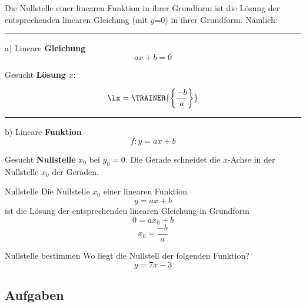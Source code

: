 Die Nullstelle einer linearen Funktion in ihrer Grundform ist die Lösung der entsprechenden linearen Gleichung (mit
$y$=0) in ihrer Grundform. Nämlich:

\hrule

a) Lineare \textbf{Gleichung} $$ax+b=0$$

Gesucht \textbf{Lösung} $x$:


\vspace{1mm}


$$\lx = \TRAINER{\left\{\frac{-b}{a}\right\}}  $$

\hrule

\newpage
b) Lineare \textbf{Funktion} $$f: y=ax+b$$

Gesucht \textbf{Nullstelle} $x_0$ bei $y_0=0$. Die Gerade schneidet
die $x$-Achse in der Nullstelle $x_0$ der Geraden.

\begin{gesetz}{Nullstelle}{}
  Die Nullstelle $x_0$ einer linearen Funktion $$y=ax+b$$ ist die Lösung der
  entsprechenden linearen Gleichung in Grundform $$0=ax_0+b$$
  $$x_0 = \frac{-b}{a}$$
\end{gesetz}

\begin{beispiel}{Nullstelle bestimmen}{}
  Wo liegt die Nullstell der folgenden Funktion?
  $$y=7x-3$$
  
\end{beispiel}
\newpage

\subsection*{Aufgaben}



\newpage

